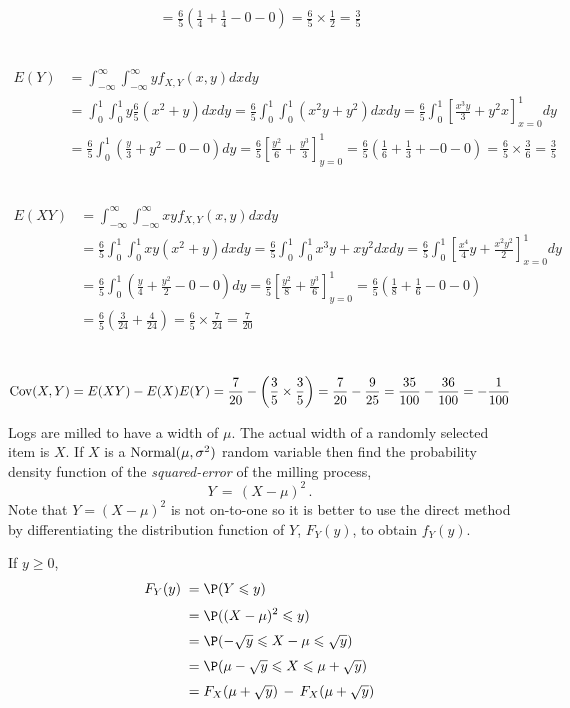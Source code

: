 \begin{ExerciseList}
\begin{align*}
= \frac{6}{5} \left(\frac{1}{4} + \frac{1}{4} - 0 - 0 \right) = \frac{6}{5}\times \frac{1}{2}=\frac{3}{5}
\end{align*}
\item~
\begin{align*}
E(Y) 
&= \int_{-\infty}^{\infty} \int_{-\infty}^{\infty} y f_{X,Y}(x,y) dx dy\\
&= \int_{0}^{1} \int_{0}^{1} y \frac{6}{5} \left( x^2 + y \right) dx dy
= \frac{6}{5} \int_{0}^{1} \int_{0}^{1}  \left( x^2y + y^2 \right) dx dy
= \frac{6}{5} \int_{0}^{1} \left[ \frac{x^3y}{3} + y^2x \right]_{x=0}^{1} dy\\
&= \frac{6}{5} \int_{0}^{1} \left( \frac{y}{3} + y^2 -0-0\right) dy
= \frac{6}{5} \left[ \frac{y^2}{6} + \frac{y^3}{3} \right]_{y=0}^{1} 
= \frac{6}{5} \left( \frac{1}{6} + \frac{1}{3} + - 0 -0 \right) = \frac{6}{5} \times \frac{3}{6}=\frac{3}{5}
\end{align*}
\item~
\begin{align*}
E(XY) 
&= \int_{-\infty}^{\infty} \int_{-\infty}^{\infty} xy f_{X,Y}(x,y) dx dy\\
&=\frac{6}{5} \int_{0}^{1} \int_{0}^{1}  xy \left( x^2 + y \right) dx dy
=\frac{6}{5} \int_{0}^{1} \int_{0}^{1} x^3y+xy^2 dx dy
=\frac{6}{5} \int_{0}^{1} \left[ \frac{x^4}{4}y+\frac{x^2 y^2}{2} \right]_{x=0}^1 dy\\
&=\frac{6}{5} \int_{0}^{1} \left( \frac{y}{4} + \frac{y^2}{2} -0-0\right)dy
=\frac{6}{5} \left[ \frac{y^2}{8} + \frac{y^3}{6}\right]_{y=0}^1 
=\frac{6}{5} \left(\frac{1}{8} + \frac{1}{6}-0-0\right)\\
&=\frac{6}{5} \left(\frac{3}{24}+\frac{4}{24}\right)=\frac{6}{5}\times\frac{7}{24}=\frac{7}{20}
\end{align*}
\item~
\[
\mathop{\rm Cov}(X,Y) = E(XY)-E(X)E(Y) = \frac{7}{20}-\left(\frac{3}{5} \times \frac{3}{5} \right) = \frac{7}{20}-\frac{9}{25} = \frac{35}{100}-\frac{36}{100} = -\frac{1}{100}
\]
\ee

\Exercise
Logs are milled to have a width of $\mu$.
The actual width of a randomly selected item is $X$.
If $X$ is a $\mbox{{\rm Normal}}(\mu,\sigma^2)$ random variable then find the probability density function of the {\em squared-error} of the milling process,
\[ Y\,=\, (X-\mu)^2\,.\]
\Answer
Note that $Y= (X-\mu)^2$ is not on-to-one so it is better to use the direct method by differentiating the distribution function  of $Y$, $F_Y(y)$,  to obtain $f_Y(y)$.

If $y\geqslant 0$,
\begin{align*}
 F_Y(y)\;=&\; \P(Y \leqslant y) \\[3pt]
 \;=&\;  \P( (X-\mu)^2 \leqslant y) \\[3pt]
 \;=&\; \P(-\sqrt y \leqslant X-\mu \leqslant \sqrt y)\\[3pt]
 \;=&\; \P(\mu -\sqrt y \leqslant X  \leqslant \mu + \sqrt y)\\[3pt]
\;=&\; F_X( \mu + \sqrt y) \,-\, F_X( \mu + \sqrt y)
\end{align*}


\end{ExerciseList}
